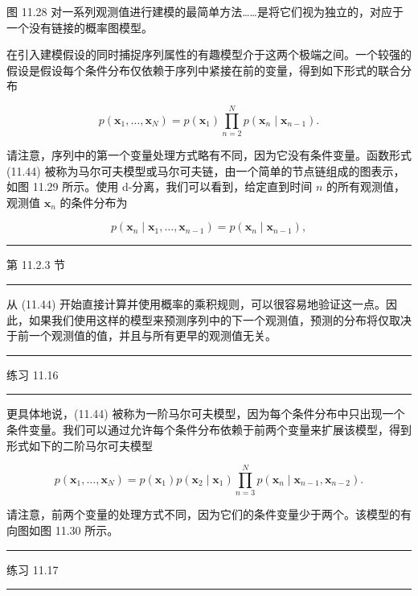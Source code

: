 \documentclass[10pt]{report}
\newcommand{\HRule}{\begin{center}\rule{0.9\linewidth}{0.2mm}\end{center}}
\begin{document}
图 11.28 对一系列观测值进行建模的最简单方法……是将它们视为独立的，对应于一个没有链接的概率图模型。

在引入建模假设的同时捕捉序列属性的有趣模型介于这两个极端之间。一个较强的假设是假设每个条件分布仅依赖于序列中紧接在前的变量，得到如下形式的联合分布

\[
p\left( {{\mathbf{x}}_{1},\ldots ,{\mathbf{x}}_{N}}\right)  = p\left( {\mathbf{x}}_{1}\right) \mathop{\prod }\limits_{{n = 2}}^{N}p\left( {{\mathbf{x}}_{n} \mid  {\mathbf{x}}_{n - 1}}\right) . \tag{11.44}
\]

请注意，序列中的第一个变量处理方式略有不同，因为它没有条件变量。函数形式 (11.44) 被称为马尔可夫模型或马尔可夫链，由一个简单的节点链组成的图表示，如图 11.29 所示。使用 d-分离，我们可以看到，给定直到时间 \(n\) 的所有观测值，观测值 \({\mathbf{x}}_{n}\) 的条件分布为

\[
p\left( {{\mathbf{x}}_{n} \mid  {\mathbf{x}}_{1},\ldots ,{\mathbf{x}}_{n - 1}}\right)  = p\left( {{\mathbf{x}}_{n} \mid  {\mathbf{x}}_{n - 1}}\right) , \tag{11.45}
\]

\HRule

第 11.2.3 节

\HRule

从 (11.44) 开始直接计算并使用概率的乘积规则，可以很容易地验证这一点。因此，如果我们使用这样的模型来预测序列中的下一个观测值，预测的分布将仅取决于前一个观测值的值，并且与所有更早的观测值无关。

\HRule

练习 11.16

\HRule

更具体地说，(11.44) 被称为一阶马尔可夫模型，因为每个条件分布中只出现一个条件变量。我们可以通过允许每个条件分布依赖于前两个变量来扩展该模型，得到形式如下的二阶马尔可夫模型

\[
p\left( {{\mathbf{x}}_{1},\ldots ,{\mathbf{x}}_{N}}\right)  = p\left( {\mathbf{x}}_{1}\right) p\left( {{\mathbf{x}}_{2} \mid  {\mathbf{x}}_{1}}\right) \mathop{\prod }\limits_{{n = 3}}^{N}p\left( {{\mathbf{x}}_{n} \mid  {\mathbf{x}}_{n - 1},{\mathbf{x}}_{n - 2}}\right) . \tag{11.46}
\]

请注意，前两个变量的处理方式不同，因为它们的条件变量少于两个。该模型的有向图如图 11.30 所示。

\HRule

练习 11.17

\HRule
\end{document}
